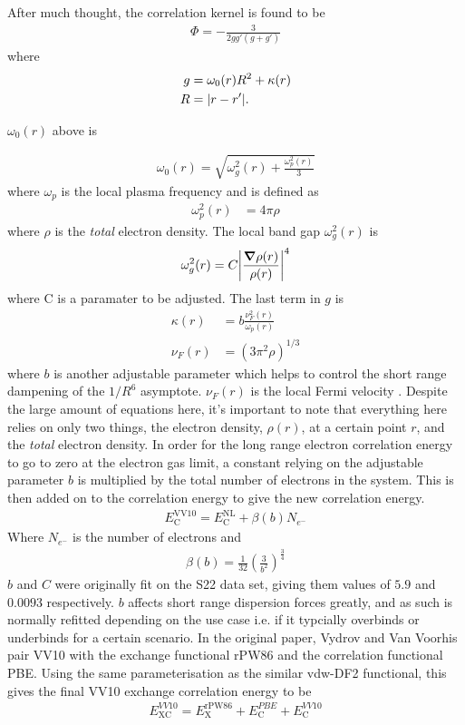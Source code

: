 \documentclass[10pt,a4paper,twocolumn,twoside]{extarticle}
\begin{document}
	After much thought, the correlation kernel is found to be  
	\begin{align}
		\Phi = - \frac{3}{2gg'(g+g')}
	\end{align}
	where 
	\begin{align}
		g &= \omega_0(r)R^2 + \kappa(r)\\
		R &= \absolutevalue{r - r'}.
	\end{align}
	
	$\omega_0(r)$ above is 

	\begin{align}
		\omega_0(r) = \sqrt{ \omega_g^2(r) + \frac{\omega_p^2(r)}{3}} 
	\end{align}
	where $\omega_p$ is the local plasma frequency and is defined as 
	\begin{align}
		\omega_p^2(r) &= 4\pi \rho
	\end{align}
	where $\rho$ is the \emph{total} electron density. The local band gap $\omega_g^2(r)$ is 
	\begin{align}
		\omega_g^2(r) = C \absolutevalue{\frac{\grad \rho(r)}{\rho(r)}}^4
	\end{align}
	where C is a paramater to be adjusted. The last term in $g$ is
	\begin{align}
		\kappa(r) &= b \frac{\nu_F^2(r)}{\omega_p(r)} \\
		\nu_F(r) &= (3 \pi^2 \rho)^{1/3}
	\end{align}
	where $b$ is another adjustable parameter which helps to control the short range dampening of the $1/R^6$ asymptote. $\nu_F(r)$ is the local Fermi velocity . 
	Despite the large amount of equations here, it's important to note that everything here relies on only two things, the electron density, $\rho(r)$, at a certain point $r$, and the \emph{total} electron density. 
	In order for the long range electron correlation energy to go to zero at the electron gas limit, a constant relying on the adjustable parameter $b$ is multiplied by the total number of electrons in the system. This is then added on to the correlation energy to give the new correlation energy.
	\begin{align}
		E_\text{C}^\text{VV10} = E_\text{C}^\text{NL} + \beta (b)N_{e^-}
	\end{align}
	Where $N_{e^-}$ is the number of electrons and 
	\begin{align}
		\beta(b) = \frac{1}{32} \left(\frac{3}{b^2}\right)^{\frac{3}{4}}
	\end{align}
	$b$ and $C$ were originally fit on the S22 data set, giving them values of $5.9$ and $0.0093$ respectively.\cite{Vydrov2012} $b$ affects short range dispersion forces greatly, and as such is normally refitted depending on the use case i.e. if it typcially overbinds or underbinds for a certain scenario.
	In the original paper, Vydrov and Van Voorhis pair VV10 with the exchange functional rPW86 and the correlation functional PBE. Using the same parameterisation as the similar vdw-DF2 functional, this gives the final VV10 exchange correlation energy to be 
	\begin{align}
		E_\text{XC}^{VV10} = E_\text{X}^\text{rPW86} + E_\text{C}^{PBE} + E_\text{C}^{VV10}
	\end{align} 
\end{document}
